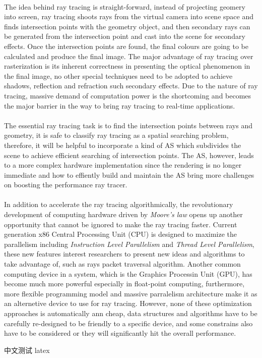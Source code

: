 \paragraph{}
The idea behind ray tracing is straight-forward, instead of projecting geomery into screen, ray tracing shoots rays from the virtual camera into scene space and finds intersection points with the geometry object, and then secondary rays can be generated from the intersection point and cast into the scene for secondary effects. Once the intersection points are found, the final colours are going to be calculated and produce the final image. The major advantage of ray tracing over rasterization is its inherent correctness in presenting the optical phenomenon in the final image, no other special techniques need to be adopted to achieve shadows, reflection and refraction such secondary effects. Due to the nature of ray tracing, massive demand of computation power is the shortcoming and becomes the major barrier in the way to bring ray tracing to real-time applications.
 
\paragraph{}
The essential ray tracing task is to find the intersection points between rays and geometry, it is safe to classify ray tracing as a spatial searching problem, therefore, it will be helpful to incorporate a kind of AS which subdivides the scene to achieve efficient searching of intersection points. The AS, however, leads to a more complex hardware implementation since the rendering is no longer immediate and how to effiently build and maintain the AS bring more challenges on boosting the performance ray tracer. 

\paragraph{}
In addition to accelerate the ray tracing algorithmically, the revolutionary development of computing hardware driven by \emph{Moore's law} opens up another opportunity that cannot be ignored to make the ray tracing faster. Current generation x86 Central Processing Unit (CPU) is designed to maximize the parallelism including \emph{Instruction Level Parallelism} and \emph{Thread Level Parallelism}, these new features interest researchers to present new ideas and algorithms to take advantage of, such as rays packet traversal algorithm. Another common computing device in a system, which is the Graphics Processin Unit (GPU), has become much more powerful especially in float-point computing, furthermore, more flexible programming model and massive parralelism architecture make it as an alternetive device to use for ray tracing. However, none of these optimization approaches is automatically ann cheap, data structures and algorithms have to be carefully re-designed to be friendly to a specific device, and some constrains also have to be considered or they will significantly hit the overall performance. 

中文测试 latex
